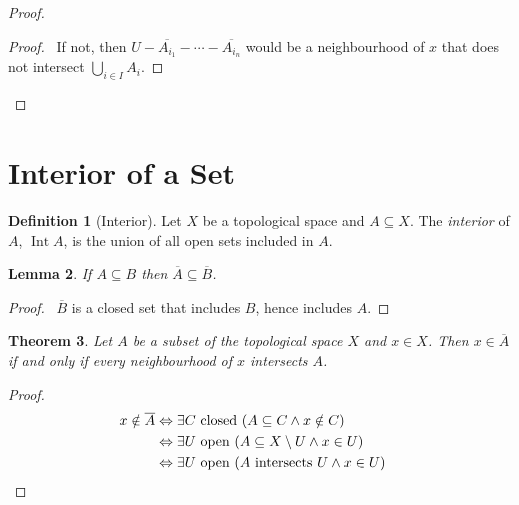 \documentclass{report}
\let\qed\relax
\newtheorem{lm}{Lemma}[section]
\newtheorem{thm}[lm]{Theorem}
\theoremstyle{definition}
\newtheorem{df}[lm]{Definition}
\newcommand{\Int}{\ensuremath{\operatorname{Int}}}
\begin{document}
  \begin{proof}
    \pf
    \begin{proof}
      \pf\ If not, then $U - \overline{A_{i_1}} - \cdots - \overline{A_{i_n}}$ would be a neighbourhood of $x$ that does not intersect $\bigcup_{i \in I} A_i$.
    \end{proof}
    \qed
  \end{proof}

  \section{Interior of a Set}

  \begin{df}[Interior]
    Let $X$ be a topological space and $A \subseteq X$.
    The \emph{interior} of $A$, $\Int A$, is the union of all open sets
    included
    in $A$.
  \end{df}

  \begin{lm}
    If $A \subseteq B$ then $\overline{A} \subseteq \overline{B}$.
  \end{lm}

  \begin{proof}
    \pf\ $\overline{B}$ is a closed set that includes $B$, hence includes $A$.
    \qed
  \end{proof}

  \begin{thm}
    \label{thm:topology:closure:neighbourhoods}
    Let $A$ be a subset of the topological space $X$ and $x \in X$. Then $x \in
    \overline{A}$ if and only if every neighbourhood of $x$ intersects $A$.
  \end{thm}

  \begin{proof}
    \pf
    \begin{align*}
      x \notin \overline{A} & \Leftrightarrow \exists C \text{ closed } (A
      \subseteq C \wedge x \notin C) \\
      & \Leftrightarrow \exists U \text{ open } (A \subseteq X \setminus U
      \wedge x
      \in U) \\
      & \Leftrightarrow \exists U \text{ open } (A \text{ intersects } U \wedge
      x
      \in U) & \qed
    \end{align*}
  \end{proof}
\end{document}
